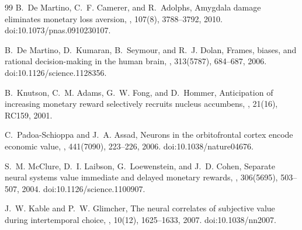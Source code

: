 \documentclass[graybox,natbib]{SNmult}
\providecommand{\1}{}
\renewcommand{\1}{\mathbbm 1}
\begin{document}
\begin{thebibliography}{99}
B.~De Martino, C.~F. Camerer, and R.~Adolphs,
\newblock Amygdala damage eliminates monetary loss aversion,
,
107(8), 3788--3792, 2010.
\newblock doi:10.1073/pnas.0910230107.

B.~De Martino, D.~Kumaran, B.~Seymour, and R.~J. Dolan,
\newblock Frames, biases, and rational decision-making in the human brain,
,
313(5787), 684--687, 2006.
\newblock doi:10.1126/science.1128356.


B.~Knutson, C.~M. Adams, G.~W. Fong, and D.~Hommer,
\newblock Anticipation of increasing monetary reward selectively recruits
nucleus accumbens,
,
21(16), RC159, 2001.

C.~Padoa-Schioppa and J.~A. Assad,
\newblock Neurons in the orbitofrontal cortex encode economic value,
,
441(7090), 223--226, 2006.
\newblock doi:10.1038/nature04676.


S.~M. McClure, D.~I. Laibson, G.~Loewenstein, and J.~D. Cohen,
\newblock Separate neural systems value immediate and delayed monetary
rewards,
,
306(5695), 503--507, 2004.
\newblock doi:10.1126/science.1100907.

J.~W. Kable and P.~W. Glimcher,
\newblock The neural correlates of subjective value during intertemporal
choice,
,
10(12), 1625--1633, 2007.
\newblock doi:10.1038/nn2007.



\end{thebibliography}
\end{document}

